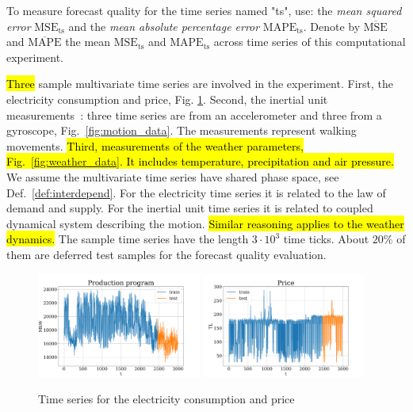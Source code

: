 \documentclass[referee, pdflatex, sn-mathphys-num]{sn-jnl}
\theoremstyle{definition}
\theoremstyle{plain}
\begin{document}
	To measure forecast quality for the time series named "ts", use: the \emph{mean squared error} $ \text{MSE}_{\text{ts}} $ and the \emph{mean absolute percentage error} $ \text{MAPE}_{\text{ts}} $. Denote by $ \overline{\text{MSE}} $ and $ \overline{\text{MAPE}} $ the mean $ \text{MSE}_{\text{ts}} $ and $ \text{MAPE}_{\text{ts}} $ across time series of this computational experiment.
	
	\hl{Three} sample multivariate time series are involved in the experiment. First, the electricity consumption and price, Fig. \ref{fig:electr_data}. Second, the inertial unit measurements~\cite{accelerometryData}: three time series are from an accelerometer and three from a gyroscope, Fig.~\ref{fig:motion_data}. The measurements represent walking movements. \hl{Third, measurements of the weather parameters, Fig.~{\ref{fig:weather_data}}. It includes temperature, precipitation and air pressure.}  We assume the multivariate time series have shared phase space, see Def.~\ref{def:interdepend}. For the electricity time series it is related to the law of demand and supply. For the inertial unit time series it is related to coupled dynamical system describing the motion. \hl{Similar reasoning applies to the weather dynamics.} The sample time series have the length $ 3 \cdot 10^3 $ time ticks. About $ 20\% $ of them are deferred test samples for the forecast quality evaluation.
	
	\begin{figure}[!htbp]
		\centering
		\includegraphics[width=0.48\textwidth, keepaspectratio]{Electricity_Production}
		\includegraphics[width=0.48\textwidth, keepaspectratio]{Electricity_Price}
		\caption{Time series for the electricity consumption and price}\label{fig:electr_data}
	\end{figure}
	
\end{document}
